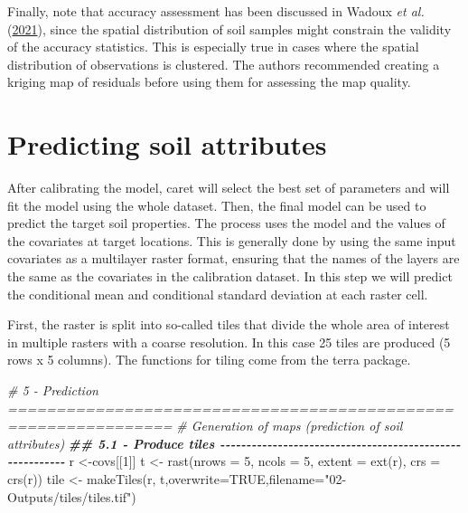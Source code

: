 \documentclass[
  10pt,
  b5paper,
  oneside]{book}
\newenvironment{Shaded}{\begin{snugshade}}{\end{snugshade}}
\newcommand{\AttributeTok}[1]{\textcolor[rgb]{0.77,0.63,0.00}{#1}}
\newcommand{\CommentTok}[1]{\textcolor[rgb]{0.56,0.35,0.01}{\textit{#1}}}
\newcommand{\ConstantTok}[1]{\textcolor[rgb]{0.00,0.00,0.00}{#1}}
\newcommand{\DecValTok}[1]{\textcolor[rgb]{0.00,0.00,0.81}{#1}}
\newcommand{\DocumentationTok}[1]{\textcolor[rgb]{0.56,0.35,0.01}{\textbf{\textit{#1}}}}
\newcommand{\FunctionTok}[1]{\textcolor[rgb]{0.00,0.00,0.00}{#1}}
\newcommand{\NormalTok}[1]{#1}
\newcommand{\OtherTok}[1]{\textcolor[rgb]{0.56,0.35,0.01}{#1}}
\newcommand{\StringTok}[1]{\textcolor[rgb]{0.31,0.60,0.02}{#1}}
\begin{document}
Finally, note that accuracy assessment has been discussed in Wadoux \emph{et al.} (\protect\hyperlink{ref-Wadoux2021}{2021}), since the spatial distribution of soil samples might constrain the validity of the accuracy statistics. This is especially true in cases where the spatial distribution of observations is clustered. The authors recommended creating a kriging map of residuals before using them for assessing the map quality.

\hypertarget{predicting-soil-attributes}{%
\section{Predicting soil attributes}\label{predicting-soil-attributes}}

After calibrating the model, caret will select the best set of parameters and will fit the model using the whole dataset. Then, the final model can be used to predict the target soil properties. The process uses the model and the values of the covariates at target locations. This is generally done by using the same input covariates as a multilayer raster format, ensuring that the names of the layers are the same as the covariates in the calibration dataset. In this step we will predict the conditional mean and conditional standard deviation at each raster cell.

First, the raster is split into so-called tiles that divide the whole area of interest in multiple rasters with a coarse resolution. In this case 25 tiles are produced (5 rows x 5 columns). The functions for tiling come from the terra package.

\begin{Shaded}
\begin{Highlighting}[]
\CommentTok{\# 5 {-} Prediction ===============================================================}
\CommentTok{\# Generation of maps (prediction of soil attributes) }
\DocumentationTok{\#\# 5.1 {-} Produce tiles {-}{-}{-}{-}{-}{-}{-}{-}{-}{-}{-}{-}{-}{-}{-}{-}{-}{-}{-}{-}{-}{-}{-}{-}{-}{-}{-}{-}{-}{-}{-}{-}{-}{-}{-}{-}{-}{-}{-}{-}{-}{-}{-}{-}{-}{-}{-}{-}{-}{-}{-}{-}{-}{-}{-}{-}{-}}
\NormalTok{r }\OtherTok{\textless{}{-}}\NormalTok{covs[[}\DecValTok{1}\NormalTok{]]}
\NormalTok{t }\OtherTok{\textless{}{-}} \FunctionTok{rast}\NormalTok{(}\AttributeTok{nrows =} \DecValTok{5}\NormalTok{, }\AttributeTok{ncols =} \DecValTok{5}\NormalTok{, }\AttributeTok{extent =} \FunctionTok{ext}\NormalTok{(r), }\AttributeTok{crs =} \FunctionTok{crs}\NormalTok{(r))}
\NormalTok{tile }\OtherTok{\textless{}{-}} \FunctionTok{makeTiles}\NormalTok{(r, t,}\AttributeTok{overwrite=}\ConstantTok{TRUE}\NormalTok{,}\AttributeTok{filename=}\StringTok{"02{-}Outputs/tiles/tiles.tif"}\NormalTok{)}
\end{Highlighting}
\end{Shaded}
\end{document}
